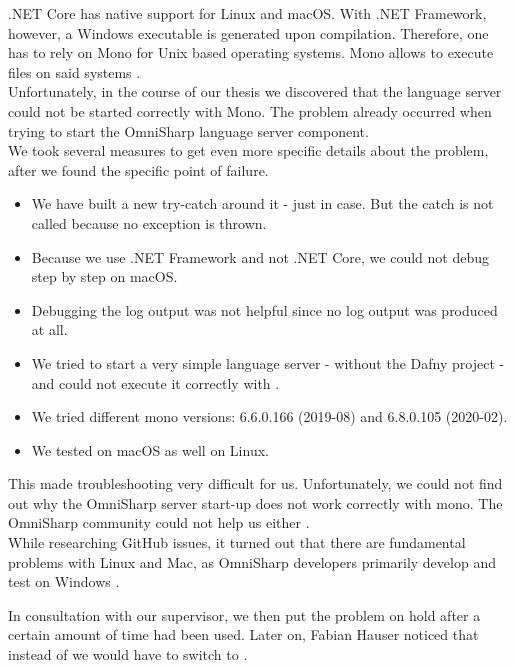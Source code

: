 .NET Core has native support for Linux and macOS.
With .NET Framework, however, a Windows executable is generated upon compilation.
Therefore, one has to rely on Mono for Unix based operating systems.
Mono allows to execute  files on said systems \cite{mono}. \\

Unfortunately, in the course of our thesis we discovered that the language server could not be started correctly with Mono.
The problem already occurred when trying to start the OmniSharp language server component. \\

We took several measures to get even more specific details about the problem, after we found the specific point of failure.

\begin{itemize}
    \item We have built a new try-catch around it - just in case. But the catch is not called because no exception is thrown.
    \item Because we use .NET Framework and not .NET Core, we could not debug step by step on macOS.
    \item Debugging the log output was not helpful since no log output was produced at all.
    \item We tried to start a very simple language server - without the Dafny project - and could not execute it correctly with .
    \item We tried different mono versions: 6.6.0.166 (2019-08) and 6.8.0.105 (2020-02).
    \item We tested on macOS as well on Linux.
\end{itemize}

This made troubleshooting very difficult for us.
Unfortunately, we could not find out why the OmniSharp server start-up does not work correctly with mono.
The OmniSharp community could not help us either \cite{mono-slack}.\\

While researching GitHub issues, it turned out that there are fundamental problems with Linux and Mac,
as OmniSharp developers primarily develop and test on Windows \cite{mono-git}.

In consultation with our supervisor, we then put the problem on hold after a certain amount of time had been used.
Later on, Fabian Hauser noticed that instead of  we would have to switch to .


